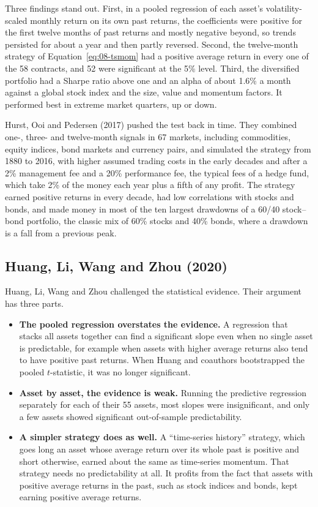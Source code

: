 Three findings stand out. First, in a pooled regression of each asset's volatility-scaled monthly return on its own past returns, the coefficients were positive for the first twelve months of past returns and mostly negative beyond, so trends persisted for about a year and then partly reversed. Second, the twelve-month strategy of Equation~\eqref{eq:08-tsmom} had a positive average return in every one of the 58 contracts, and 52 were significant at the 5\% level. Third, the diversified portfolio had a Sharpe ratio above one and an alpha of about 1.6\% a month against a global stock index and the size, value and momentum factors. It performed best in extreme market quarters, up or down.

Hurst, Ooi and Pedersen (2017) pushed the test back in time. They combined one-, three- and twelve-month signals in 67 markets, including commodities, equity indices, bond markets and currency pairs, and simulated the strategy from 1880 to 2016, with higher assumed trading costs in the early decades and after a 2\% management fee and a 20\% performance fee, the typical fees of a hedge fund, which take 2\% of the money each year plus a fifth of any profit. The strategy earned positive returns in every decade, had low correlations with stocks and bonds, and made money in most of the ten largest drawdowns of a 60/40 stock--bond portfolio, the classic mix of 60\% stocks and 40\% bonds, where a drawdown is a fall from a previous peak.

\subsection{Huang, Li, Wang and Zhou (2020)}

Huang, Li, Wang and Zhou challenged the statistical evidence. Their argument has three parts.

\begin{itemize}
  \item \textbf{The pooled regression overstates the evidence.} A regression that stacks all assets together can find a significant slope even when no single asset is predictable, for example when assets with higher average returns also tend to have positive past returns. When Huang and coauthors bootstrapped the pooled $t$-statistic, it was no longer significant.
  \item \textbf{Asset by asset, the evidence is weak.} Running the predictive regression separately for each of their 55 assets, most slopes were insignificant, and only a few assets showed significant out-of-sample predictability.
  \item \textbf{A simpler strategy does as well.} A ``time-series history'' strategy, which goes long an asset whose average return over its whole past is positive and short otherwise, earned about the same as time-series momentum. That strategy needs no predictability at all. It profits from the fact that assets with positive average returns in the past, such as stock indices and bonds, kept earning positive average returns.
\end{itemize}

